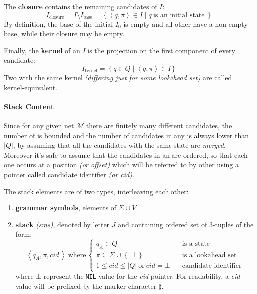 \documentclass[english]{article}
\begin{document}
The \textbf{closure} contains the remaining candidates of \(I\):
\[ I_{\text{closure}} = I \setminus I_{\text{base}} = \left\{ \left\langle q , \pi \right\rangle \in I \mid q \ \text{is an initial state} \ \right\} \]
By definition, the base of the initial \mstate \(I_0\) is empty and all other \mstates have a non-empty base, while their closure may be empty.

Finally, the \textbf{kernel} of an \mstate \(I\) is the projection on the first component of every candidate:
\[ I_{\text{kernel}} = \left\{ q \in Q \mid \left\langle q, \pi \right\rangle \in I \right\} \]
Two \mstates with the same kernel \textit{(differing just for some lookahead set)} are called kernel-equivalent.

\paragraph{Stack Content}
\label{par:stack-content}

Since for any given net \(\mathcal{M}\) there are finitely many different candidates, the number of \mstates is bounded and the number of candidates in any \mstate is always lower than \(| Q |\), by assuming that all the candidates with the same state are \textit{merged}.
Moreover it's safe to assume that the candidates in an \mstate are ordered, so that each one occurs at a position \textit{(or offset)} which will be referred to by other \mstates using a pointer called candidate identifier \textit{(or cid)}.

The stack elements are of two types, interleaving each other:

\begin{enumerate}
  \item \textbf{grammar symbols}, elements of \(\Sigma \cup V\)
  \item \textbf{stack \mstates} \textit{(sms)}, denoted by letter \(J\) and containing ordered set of \(3\)-tuples of the form:
        \[ \left\langle q_A, \pi, \textit{cid} \, \right\rangle \ \text{where} \ \begin{cases}
            q_A \in Q \quad                                                        & \text{is a state}           \\
            \pi \subseteq \Sigma \cup \left\{ \dashv \right\} \quad                & \text{is a lookahead set}   \\
            1 \leq \textit{cid} \leq | Q | \ \text{or} \ \textit{cid} = \bot \quad & \text{candidate identifier}
          \end{cases} \]
        where \(\bot\) represent the \texttt{NIL} value for the \textit{cid} pointer.
        For readability, a \textit{cid} value will be prefixed by the marker character \(\sharp\).
\end{enumerate}
\end{document}
